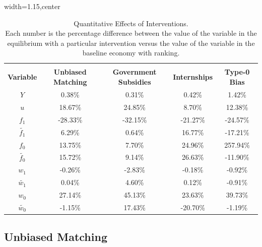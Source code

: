 \documentclass[12pt]{article} %
\theoremstyle{definition}
\begin{document}
\begin{table}[h!]

\begin{adjustbox}{width=1.15\columnwidth,center}

 \begin{tabular}{||c c c c c||} 
 \hline
 \\[-1.1em]
 \textbf{Variable} & \textbf{Unbiased Matching} & \textbf{Government Subsidies} & \textbf{Internships} & \textbf{Type-0 Bias}  \\  
 \hline\hline
  $Y$  & 0.38\% & 0.31\% & 0.42\% & 1.42\%   \\ 
  $u$  & 18.67\% & 24.85\% & 8.70\% & 12.38\%   \\ 
  $f_{1}$  & -28.33\% & -32.15\% & -21.27\% & -24.57\%   \\ 
  $\tilde{f_{1}}$  & 6.29\% & 0.64\% & 16.77\% & -17.21\% \\
  $f_{0}$  &  13.75\% & 7.70\% & 24.96\% & 257.94\% \\
  $\tilde{f_{0}}$  & 15.72\% & 9.14\% & 26.63\% & -11.90\%\\
  $w_{1}$  & -0.26\% & -2.83\% & -0.18\% & -0.92\%\\
  $\tilde{w_{1}}$ & 0.04\% & 4.60\% & 0.12\% & -0.91\%\\
  $w_{0}$  & 27.14\% & 45.13\% & 23.63\% & 39.73\%\\
  $\tilde{w_{0}}$ & -1.15\% & 17.43\% & -20.70\% & -1.19\% \\ [1ex] 
 \hline
 \end{tabular}
\end{adjustbox}
\centering
     \captionsetup{justification=centering}
\caption{Quantitative Effects of Interventions. \\ Each number is the percentage difference between the value of the variable in the equilibrium with a particular intervention versus the value of the variable in the baseline economy with ranking.} \label{table_quantitative_results}
\end{table} 

\subsection{Unbiased Matching} \label{section unbiased matching quant}
\end{document}
